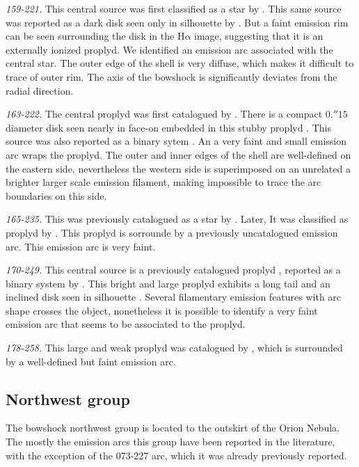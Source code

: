 \documentclass[apj, twocolumn]{aastex63}
\newcommand\ha{\ensuremath{\mathrm{H\alpha}}}
\renewcommand\clearpage{}
\begin{document}
\textit{159-221.} This central source was first classified as
a star by \citet{ODell:1996a}. This same source was reported as
a dark disk seen only in silhouette by \citet{Ricci:2008a}.
But a faint emission rim can be seen surrounding the disk in
the \ha{} image, suggesting that it is an externally ionized
proplyd. We identified an emission arc associated with the
central star. The outer edge of the shell is very diffuse,
which  makes it difficult to trace of outer rim. The axis of
the bowshock is significantly deviates from the radial
direction.

\textit{163-222.} The central proplyd was first catalogued
by \citet{ODell:1996a}. There is a compact \(0.''15\) diameter
disk seen nearly in face-on embedded in this stubby
proplyd \citep{Bally:2000a, Ricci:2008a}.  This source
was also reported as a binary sytem \citep{Ricci:2008a}.
An a very faint and small emission arc wraps the proplyd.
The outer and inner edges of the shell are well-defined on
the eastern side, nevertheless the western side is superimposed
on an unrelated a brighter larger scale emission filament,
making impossible to trace the arc boundaries on this side.

\textit{165-235.} This was previously catalogued as a star
by \citet{ODell:1996a}. Later, It was classified as proplyd
by \citet{Ricci:2008a}. This proplyd is sorrounde by a
previously uncatalogued emission arc. This emission arc is
very faint.


\textit{170-249.} This central source is a previously
catalogued proplyd \citep{ODell:1996a}, reported as a
binary system by \citet{Ricci:2008a}. This bright and
large proplyd exhibits a long tail and an inclined disk
seen in silhouette \citep{Bally:2000a}. Several
filamentary emission features with arc shape crosses the
object, nonetheless it is possible to identify a very faint
emission arc that seems to be associated to the proplyd.  

\textit{178-258.}  This large and weak proplyd was catalogued
by \citet{Ricci:2008a}, which is surrounded by a well-defined
but faint emission arc.

\clearpage
\subsection{Northwest group}
\label{sec:nw-group}



The bowshock northwest group is located to the outskirt of
the Orion Nebula. The mostly the emission arcs this group
have been reported in the literature, with the exception
of the  073-227 arc, which it was already previously reported.    
\end{document}
